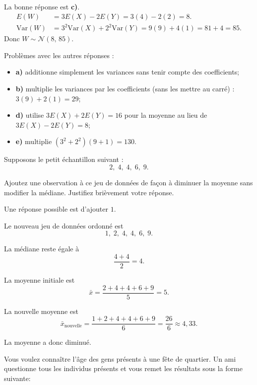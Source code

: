 \begin{questions}
\begin{solution}
La bonne réponse est \textbf{c)}.
\begin{align*}
E(W)&=3E(X)-2E(Y)=3(4)-2(2)=8.\\
\mathrm{Var}(W)&=3^2\mathrm{Var}(X)+2^2\mathrm{Var}(Y)=9(9)+4(1)=81+4=85.
\end{align*}
Donc $W\sim\mathcal{N}(8,\,85)$.

Problèmes avec les autres réponses :
\begin{itemize}
\item \textbf{a)} additionne simplement les variances sans tenir compte des coefficients;
\item \textbf{b)} multiplie les variances par les coefficients (sans les mettre au carré) : $3(9)+2(1)=29$;
\item \textbf{d)} utilise $3E(X)+2E(Y)=16$ pour la moyenne au lieu de $3E(X)-2E(Y)=8$;
\item \textbf{e)} multiplie $(3^2+2^2)(9+1)=130$.
\end{itemize}
\end{solution}

\newpage


\question[3]

Supposons le petit échantillon suivant :
\[
2,\;4,\;4,\;6,\;9.
\]

Ajoutez une observation à ce jeu de données de façon à diminuer la moyenne sans modifier la médiane. Justifiez brièvement votre réponse.

\begin{solution}
Une réponse possible est d'ajouter \(1\).

Le nouveau jeu de données ordonné est
\[
1,\;2,\;4,\;4,\;6,\;9.
\]

La médiane reste égale à
\[
\frac{4+4}{2}=4.
\]

La moyenne initiale est
\[
\bar{x}=\frac{2+4+4+6+9}{5}=5.
\]

La nouvelle moyenne est
\[
\bar{x}_{\text{nouvelle}}=\frac{1+2+4+4+6+9}{6}
=
\frac{26}{6}
\approx 4{,}33.
\]

La moyenne a donc diminué.
\end{solution}

\vspace{2in}

\question[6]

Vous voulez connaître l'âge des gens présents à une fête de quartier. Un ami questionne tous les individus présents et vous remet les résultats sous la forme suivante: 



\end{questions}
